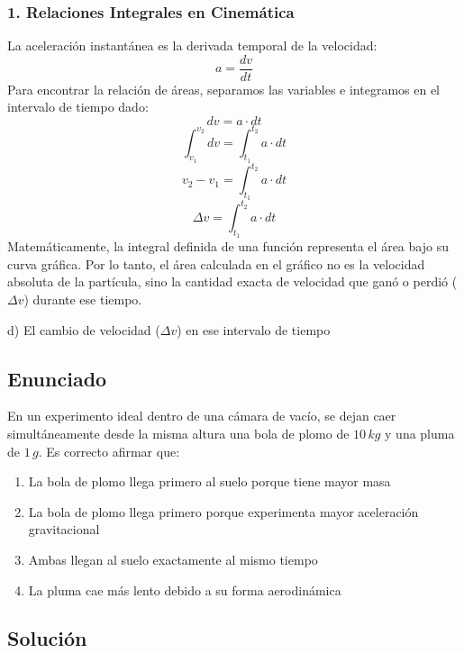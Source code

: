 \documentclass[12pt, a4paper]{article}
\begin{document}
\subsubsection*{1. Relaciones Integrales en Cinemática}
La aceleración instantánea es la derivada temporal de la velocidad:
$$ a = \frac{dv}{dt} $$
Para encontrar la relación de áreas, separamos las variables e integramos en el intervalo de tiempo dado:
$$ dv = a \cdot dt $$
$$ \int_{v_1}^{v_2} dv = \int_{t_1}^{t_2} a \cdot dt $$
$$ v_2 - v_1 = \int_{t_1}^{t_2} a \cdot dt $$
$$ \Delta v = \int_{t_1}^{t_2} a \cdot dt $$
Matemáticamente, la integral definida de una función representa el área bajo su curva gráfica. Por lo tanto, el área calculada en el gráfico no es la velocidad absoluta de la partícula, sino la cantidad exacta de velocidad que ganó o perdió ($\Delta v$) durante ese tiempo.

\begin{tcolorbox}[colback=green!5!white, colframe=green!50!black, title=Respuesta Final]
\centering \Large d) El cambio de velocidad ($\Delta v$) en ese intervalo de tiempo
\end{tcolorbox}

\newpage

\subsection*{Enunciado}
En un experimento ideal dentro de una cámara de vacío, se dejan caer simultáneamente desde la misma altura una bola de plomo de $10\,\si{kg}$ y una pluma de $1\,\si{g}$. Es correcto afirmar que:
\begin{enumerate}[label=\alph*)]
    \item La bola de plomo llega primero al suelo porque tiene mayor masa
    \item La bola de plomo llega primero porque experimenta mayor aceleración gravitacional
    \item Ambas llegan al suelo exactamente al mismo tiempo
    \item La pluma cae más lento debido a su forma aerodinámica
\end{enumerate}

\subsection*{Solución}
\end{document}
